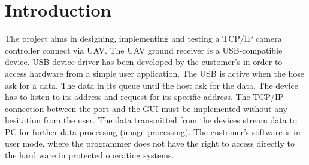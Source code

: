 \chapter{Introduction}
The project aims in designing, implementing and testing a TCP/IP camera controller connect via UAV. The UAV ground receiver is a USB-compatible device. USB device driver has been developed by the customer’s in order to access hardware from a simple user application. The USB is active when the hose ask for a data. The data in its queue until the host ask for the data. The device has to listen to its address and request for its specific address. The TCP/IP connection between the port and the GUI must be implemented without any hesitation from the user. The data transmitted from the devices stream data to PC for further data processing (image processing).  The customer’s software is in user mode, where the programmer does not have the right to access directly to the hard ware in protected operating systems.
